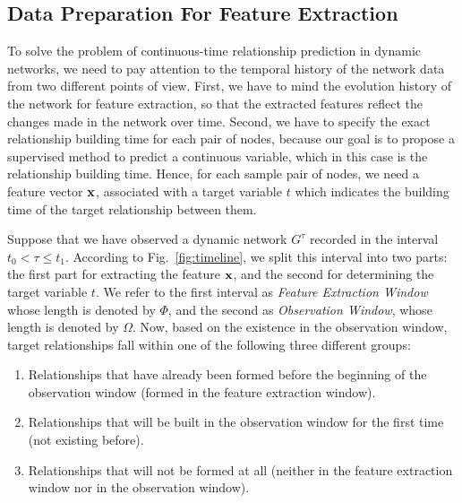\subsection{Data Preparation For Feature Extraction}
To solve the problem of continuous-time relationship prediction in dynamic networks, we need to pay attention to the temporal history of the network data from two different points of view. First, we have to mind the evolution history of the network for feature extraction, so that the extracted features reflect the changes made in the network over time. Second, we have to specify the exact relationship building time for each pair of nodes, because our goal is to propose a supervised method to predict a continuous variable, which in this case is the relationship building time. Hence, for each sample pair of nodes, we need a feature vector $\mathbf{x}$, associated with a target variable $t$ which indicates the building time of the target relationship between them.

Suppose that we have observed a dynamic network $G^{\tau}$ recorded in the interval $t_0 <\tau\le t_1$. According to Fig.~\ref{fig:timeline}, we split this interval into two parts: the first part for extracting the feature $\mathbf{x}$, and the second for determining the target variable $t$. We refer to the first interval as \emph{Feature Extraction Window} whose length is denoted by $\Phi$, and the second as \emph{Observation Window}, whose length is denoted by $\Omega$. Now, based on the existence in the observation window, target relationships fall within one of the following three different groups:

\begin{enumerate}
	\item Relationships that have already been formed before the beginning of the observation window (formed in the feature extraction window).
	\item Relationships that will be built in the observation window for the first time (not existing before).
	\item Relationships that will not be formed at all (neither in the feature extraction window nor in the observation window).
\end{enumerate}

